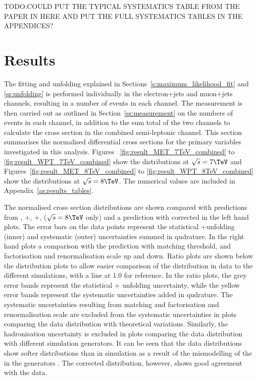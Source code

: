 TODO:COULD PUT THE TYPICAL SYSTEMATICS TABLE FROM THE PAPER IN HERE AND PUT THE FULL SYSTEMATICS TABLES IN THE
APPENDICES?

\section{Results}
\label{s:results}

The fitting and unfolding explained in Sections~\ref{s:maximum_likelihood_fit} and \ref{ss:unfolding} is
performed individually in the electron+jets and muon+jets channels, resulting in a number of \ttbar events in
each channel. The measurement is then carried out as outlined in Section~\ref{ss:measurement} on the
numbers of events in each channel, in addition to the sum total of the two channels to calculate the
cross section in the combined semi-leptonic channel. This section summarises
the normalised differential cross sections for the primary variables investigated in this analysis. Figures ~\ref{fig:result_MET_7TeV_combined} to \ref{fig:result_WPT_7TeV_combined} show the distributions at $\sqrt{s}=7\TeV$ and Figures~\ref{fig:result_MET_8TeV_combined} to \ref{fig:result_WPT_8TeV_combined} show the distributions at $\sqrt{s}=8\TeV$. The numerical values are included in Appendix~\ref{as:results_tables}.

The normalised cross section distributions are shown compared with predictions from \MADGRAPH,
\POWHEG+\PYTHIA, \POWHEG+\HERWIG, \MCATNLO ($\sqrt{s}=8\TeV$ only) and a \MADGRAPH prediction with corrected
\tquark \pt in the left hand plots. The error bars on the data points represent the statistical +unfolding
(inner) and systematic (outer) uncertainties summed in qudrature. In the right hand plots a comparison with
the \MADGRAPH prediction with matching threshold, and factorisation and renormalisation scale up and down.
Ratio plots are shown below the distribution plots to allow easier comparison of the distribution in data to
the different simulations, with a line at 1.0 for reference. In the ratio plots, the grey error bands
represent the statistical + unfolding uncertainty, while the yellow error bands represent the systematic
uncertainties added in qudrature. The systematic uncertainties resulting from matching and factorisation and
renormalisation scale are excluded from the systematic uncertainties in plots comparing the data distribution
with theoretical variations. Similarly, the hadronisation uncertainty is excluded in plots comparing the data
distribution with different simulation generators. It can be seen that the data distributions show softer
distributions than in simulation as a result of the mismodelling of the \tquark \pt in the generators \cite{Chatrchyan:2012saa}. The corrected \MADGRAPH distribution, however, shows good agreement with the data.

